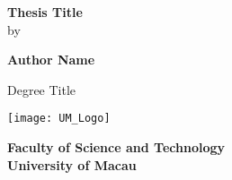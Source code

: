 \thispagestyle{empty}
\begin{titlepage}
    \begin{center}
        \bigskip
        \bigskip
        \Large \textbf{Thesis Title}\\
        \bigskip by\\
        \begin{spacing}{2}
            \textbf{Author Name}\\
        \end{spacing}
        \vfill
            Degree Title\\
            \vfill
            \date{Day Month Year}
        \texttt{[image: UM\_Logo]}\\
        \begin{spacing}{1}
            \Large
            \textbf{Faculty of Science and Technology}\\
            \textbf{University of Macau}
        \end{spacing}
    \end{center}
\end{titlepage}